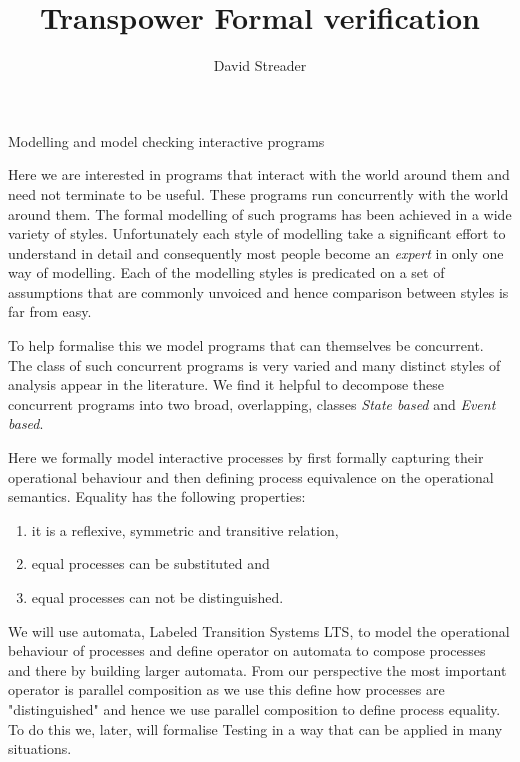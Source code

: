 \documentclass[]{article}
\begin{document}
\pagestyle{empty} %



\title{Transpower Formal verification}
\author{David Streader}

\pagestyle{plain} %

{\LARGE \bf
\begin{center}
Modelling  and model checking interactive programs
\end{center}
}



Here we are interested in programs that interact with the world around them and need not terminate to be useful. These programs  run concurrently with the world around them. The formal modelling   of such programs has been achieved in a wide variety of styles. Unfortunately each style of modelling take a significant effort to understand in detail and consequently most people become an \emph{expert} in only one way of modelling. Each of the modelling styles  is predicated on a set of assumptions that are commonly unvoiced and hence comparison between styles is far from easy.



To help formalise this we  model programs that can themselves be concurrent. The class of such concurrent programs is very varied  and many distinct styles of analysis appear in the literature.  We find it helpful to decompose these concurrent programs into two broad, overlapping,  classes \emph{State based} and \emph{Event based}.  

Here we  formally model interactive processes by first formally capturing their operational behaviour and then defining  process equivalence on the operational semantics. Equality  has the following properties:
\begin{enumerate}
\item it is a reflexive, symmetric and transitive relation,
\item equal processes can be substituted and 
\item equal processes can not  be distinguished.
\end{enumerate}


We will use automata, Labeled Transition Systems LTS, to model the operational behaviour of processes and define operator on automata to compose processes and there by building larger automata. From our perspective the most important operator is parallel composition as we use this define how processes are "distinguished" and hence we use parallel composition to define process equality. To do this we, later,  will formalise Testing in a way that can be applied in many situations.
\end{document}
